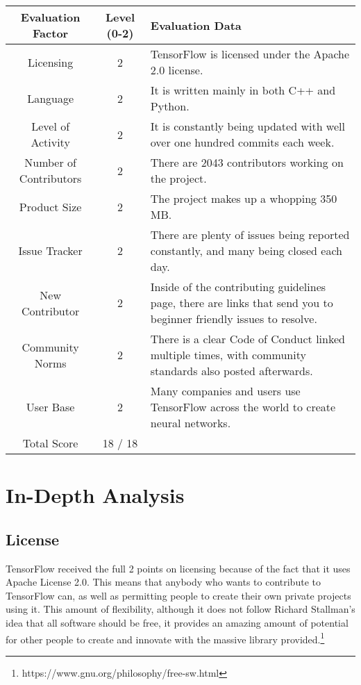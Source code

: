 \documentclass[12pt]{article}
\begin{document}
\begin{enumerate}
		\hspace*{-1cm}
		\noindent\begin{tabular}{ | c | c | L | } 
			\hline
			Evaluation Factor & Level (0-2) & Evaluation Data \\\hline
			Licensing & 2 & TensorFlow is licensed under the Apache 2.0 license. \\\hline
			Language & 2 & It is written mainly in both C++ and Python. \\\hline
			Level of Activity & 2 & It is constantly being updated with well over one hundred commits each week. \\\hline		
			Number of Contributors & 2 & There are 2043 contributors working on the project. \\\hline
			Product Size & 2 & The project makes up a whopping 350 MB. \\\hline
			Issue Tracker & 2 & There are plenty of issues being reported constantly, and many being closed each day. \\\hline
			New Contributor & 2 & Inside of the contributing guidelines page, there are links that send you to beginner friendly issues to resolve. \\\hline
			Community Norms & 2 & There is a clear Code of Conduct linked multiple times, with community standards also posted afterwards. \\\hline
			User Base & 2 & Many companies and users use TensorFlow across the world to create neural networks. \\\hline
			Total Score & 18 / 18 & \\\hline
		\end{tabular}
	
	\end{enumerate}
	
	\section{In-Depth Analysis}
	
	\subsection{License}
	TensorFlow received the full 2 points on licensing because of the fact that it uses Apache License 2.0. This means that anybody who wants to contribute to TensorFlow can, as well as permitting people to create their own private projects using it. This amount of flexibility, although it does not follow Richard Stallman's idea that all software should be free, it provides an amazing amount of potential for other people to create and innovate with the massive library provided.\footnote{https://www.gnu.org/philosophy/free-sw.html}
	
\end{document}
